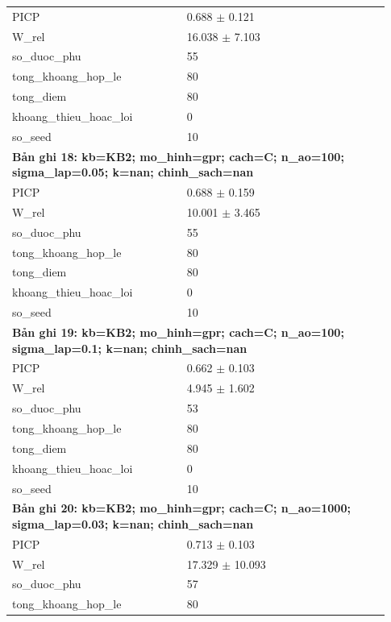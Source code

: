 \begin{longtable}{p{0.43\linewidth}p{0.50\linewidth}}
PICP & 0.688 $\pm$ 0.121 \\
W\_\allowbreak rel & 16.038 $\pm$ 7.103 \\
so\_\allowbreak duoc\_\allowbreak phu & 55 \\
tong\_\allowbreak khoang\_\allowbreak hop\_\allowbreak le & 80 \\
tong\_\allowbreak diem & 80 \\
khoang\_\allowbreak thieu\_\allowbreak hoac\_\allowbreak loi & 0 \\
so\_\allowbreak seed & 10 \\
\midrule
\multicolumn{2}{p{0.95\linewidth}}{\textbf{Bản ghi 18: kb=KB2; mo\_hinh=gpr; cach=C; n\_ao=100; sigma\_lap=0.05; k=nan; chinh\_sach=nan}} \\
PICP & 0.688 $\pm$ 0.159 \\
W\_\allowbreak rel & 10.001 $\pm$ 3.465 \\
so\_\allowbreak duoc\_\allowbreak phu & 55 \\
tong\_\allowbreak khoang\_\allowbreak hop\_\allowbreak le & 80 \\
tong\_\allowbreak diem & 80 \\
khoang\_\allowbreak thieu\_\allowbreak hoac\_\allowbreak loi & 0 \\
so\_\allowbreak seed & 10 \\
\midrule
\multicolumn{2}{p{0.95\linewidth}}{\textbf{Bản ghi 19: kb=KB2; mo\_hinh=gpr; cach=C; n\_ao=100; sigma\_lap=0.1; k=nan; chinh\_sach=nan}} \\
PICP & 0.662 $\pm$ 0.103 \\
W\_\allowbreak rel & 4.945 $\pm$ 1.602 \\
so\_\allowbreak duoc\_\allowbreak phu & 53 \\
tong\_\allowbreak khoang\_\allowbreak hop\_\allowbreak le & 80 \\
tong\_\allowbreak diem & 80 \\
khoang\_\allowbreak thieu\_\allowbreak hoac\_\allowbreak loi & 0 \\
so\_\allowbreak seed & 10 \\
\midrule
\multicolumn{2}{p{0.95\linewidth}}{\textbf{Bản ghi 20: kb=KB2; mo\_hinh=gpr; cach=C; n\_ao=1000; sigma\_lap=0.03; k=nan; chinh\_sach=nan}} \\
PICP & 0.713 $\pm$ 0.103 \\
W\_\allowbreak rel & 17.329 $\pm$ 10.093 \\
so\_\allowbreak duoc\_\allowbreak phu & 57 \\
tong\_\allowbreak khoang\_\allowbreak hop\_\allowbreak le & 80 \\

\end{longtable}
